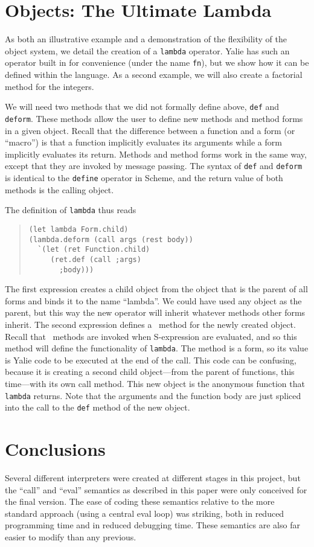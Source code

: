 \documentclass[twocolumn]{article}
\begin{document}
\section*{Objects: The Ultimate Lambda}
As both an illustrative example and a demonstration of the flexibility
of the object system, we detail the creation of a \texttt{lambda}
operator. Yalie has such an operator built in for convenience (under
the name \texttt{fn}), but we show how it can be defined within the
language. As a second example, we will also create a factorial method
for the integers.

We will need two methods that we did not formally define above,
\texttt{def} and \texttt{deform}. These methods allow the user to
define new methods and method forms in a given object. Recall that the
difference between a function and a form (or ``macro'') is that a
function implicitly evaluates its arguments while a form implicitly
evaluates its return. Methods and method forms work in the same way,
except that they are invoked by message passing. The syntax of
\texttt{def} and \texttt{deform} is identical to the \texttt{define}
operator in Scheme, and the return value of both methods is the
calling object.

The definition of \texttt{lambda} thus reads
\begin{quote}
\begin{verbatim}
(let lambda Form.child)
(lambda.deform (call args (rest body))
  `(let (ret Function.child)
     (ret.def (call ;args)
       ;body)))
\end{verbatim}
\end{quote}
The first expression creates a child object from the object that is
the parent of all forms and binds it to the name ``lambda''. We could
have used any object as the parent, but this way the new operator will
inherit whatever methods other forms inherit. The second expression
defines a \call\ method for the newly created object. Recall that
\call\ methods are invoked when S-expression are evaluated, and so
this method will define the functionality of \texttt{lambda}. The
method is a form, so its value is Yalie code to be executed at the end
of the call. This code can be confusing, because it is creating a
second child object---from the parent of functions, this time---with
its own call method. This new object is the anonymous function that
\texttt{lambda} returns. Note that the arguments and the function body
are just spliced into the call to the \texttt{def} method of the new
object.


\section*{Conclusions}
Several different interpreters were created at different stages in
this project, but the ``call'' and ``eval'' semantics as described in
this paper were only conceived for the final version. The ease of
coding these semantics relative to the more standard approach (using a
central eval loop) was striking, both in reduced programming time and
in reduced debugging time. These semantics are also far easier to
modify than any previous.
\end{document}
